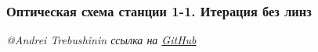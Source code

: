 \documentclass[14pt, hyperref = {colorlinks}]{beamer}
\begin{document}
\small
\begin{frame}
\frametitle{Оптическая схема станции 1-1. Итерация без линз}\label{t1}
\vspace{-20pt}
\begin{figure}[h]
\end{figure}
\vspace{-15pt}
\begin{figure}[h]
\end{figure}
\tiny{\textit{@Andrei Trebushinin ссылка на \href{https://github.com/TrebAndrew/thesis_andrei.git}{GitHub}}}
\end{frame}
\end{document}
